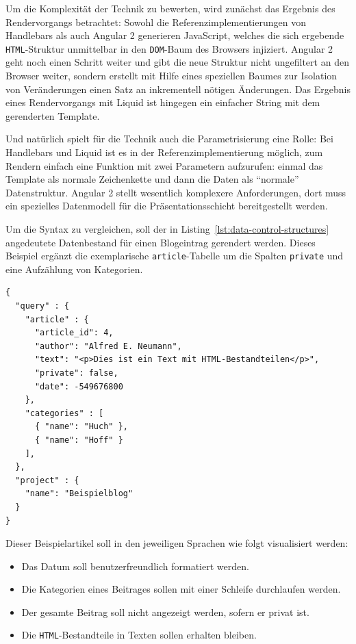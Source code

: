 Um die Komplexität der Technik zu bewerten, wird zunächst das Ergebnis des Rendervorgangs betrachtet: Sowohl die Referenzimplementierungen von Handlebars als auch Angular 2 generieren JavaScript, welches die sich ergebende \texttt{HTML}-Struktur unmittelbar in den \texttt{DOM}-Baum des Browsers injiziert. Angular 2 geht noch einen Schritt weiter und gibt die neue Struktur nicht ungefiltert an den Browser weiter, sondern erstellt mit Hilfe eines speziellen Baumes zur Isolation von Veränderungen einen Satz an inkrementell nötigen Änderungen. Das Ergebnis eines Rendervorgangs mit Liquid ist hingegen ein einfacher String mit dem gerenderten Template.

Und natürlich spielt für die Technik auch die Parametrisierung eine Rolle: Bei Handlebars und Liquid ist es in der Referenzimplementierung möglich, zum Rendern einfach eine Funktion mit zwei Parametern aufzurufen: einmal das Template als normale Zeichenkette und dann die Daten als "`normale"' Datenstruktur. Angular 2 stellt wesentlich komplexere Anforderungen, dort muss ein spezielles Datenmodell für die Präsentationsschicht bereitgestellt werden.

Um die Syntax zu vergleichen, soll der in Listing~\ref{lst:data-control-structures} angedeutete Datenbestand für einen Blogeintrag gerendert werden. Dieses Beispiel ergänzt die exemplarische \texttt{article}-Tabelle um die Spalten \texttt{private} und eine Aufzählung von Kategorien.

\begin{lstlisting}[float=h!,caption={JSON-Darstellung eines exemplarischen Datenbestandes}, label={lst:data-control-structures}]
{
  "query" : {
    "article" : {
      "article_id": 4,
      "author": "Alfred E. Neumann",
      "text": "<p>Dies ist ein Text mit HTML-Bestandteilen</p>",
      "private": false,
      "date": -549676800
    },
    "categories" : [
      { "name": "Huch" },
      { "name": "Hoff" }
    ],
  },
  "project" : {
    "name": "Beispielblog"
  }
}
\end{lstlisting}

Dieser Beispielartikel soll in den jeweiligen Sprachen wie folgt visualisiert werden:
\begin{itemize}[noitemsep]
\item Das Datum soll benutzerfreundlich formatiert werden.
\item Die Kategorien eines Beitrages sollen mit einer Schleife durchlaufen werden.
\item Der gesamte Beitrag soll nicht angezeigt werden, sofern er privat ist.
\item Die \texttt{HTML}-Bestandteile in Texten sollen erhalten bleiben.
\end{itemize}

